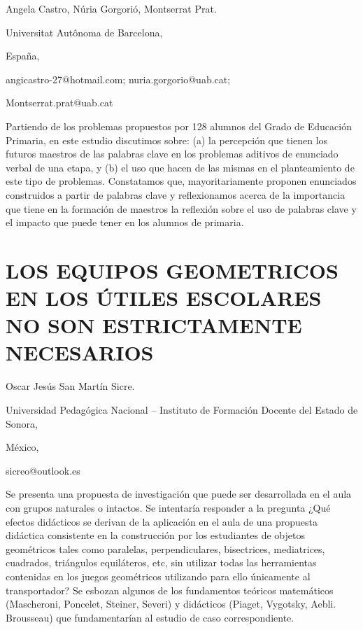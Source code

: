 \begin{datos}

Angela Castro, Núria Gorgorió, Montserrat Prat.

Universitat Autônoma de Barcelona,

España,

angicastro-27@hotmail.com; nuria.gorgorio@uab.cat;

Montserrat.prat@uab.cat 

\end{datos}

Partiendo de los problemas propuestos por 128 alumnos del Grado de
Educación Primaria, en este estudio discutimos sobre: (a) la percepción
que tienen los futuros maestros de las palabras clave en los problemas
aditivos de enunciado verbal de una etapa, y (b) el uso que hacen
de las mismas en el planteamiento de este tipo de problemas. Constatamos
que, mayoritariamente proponen enunciados construidos a partir de
palabras clave y reflexionamos acerca de la importancia que tiene
en la formación de maestros la reflexión sobre el uso de palabras
clave y el impacto que puede tener en los alumnos de primaria. 


\section{LOS EQUIPOS GEOMETRICOS EN LOS ÚTILES ESCOLARES NO SON ESTRICTAMENTE
NECESARIOS}

\begin{datos}

Oscar Jesús San Martín Sicre.

Universidad Pedagógica Nacional – Instituto de Formación Docente del
Estado de Sonora,

México,

sicreo@outlook.es 

\end{datos}

Se presenta una propuesta de investigación que puede ser desarrollada
en el aula con grupos naturales o intactos. Se intentaría responder
a la pregunta ¿Qué efectos didácticos se derivan de la aplicación
en el aula de una propuesta didáctica consistente en la construcción
por los estudiantes de objetos geométricos tales como paralelas, perpendiculares,
bisectrices, mediatrices, cuadrados, triángulos equiláteros, etc,
sin utilizar todas las herramientas contenidas en los juegos geométricos
utilizando para ello únicamente al transportador? Se esbozan algunos
de los fundamentos teóricos matemáticos (Mascheroni, Poncelet, Steiner,
Severi) y didácticos (Piaget, Vygotsky, Aebli. Brousseau) que fundamentarían
al estudio de caso correspondiente.



